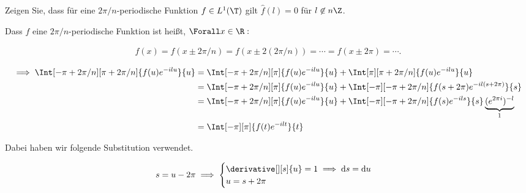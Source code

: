 
\begin{exercise}

Zeigen Sie, dass für eine $2 \pi / n$-periodische Funktion $f \in L^1(\T)$ gilt $\hat f(l) = 0$ für $l \not \in n \Z$.

\end{exercise}


\begin{solution}

Dass $f$ eine $2 \pi / n$-periodische Funktion ist heißt, $\Forall x \in \R:$

\begin{align*}
    f(x)
    =
    f(x \pm 2 \pi / n)
    =
    f(x \pm 2 (2 \pi / n))
    =
    \cdots
    =
    f(x \pm 2 \pi)
    =
    \cdots.
\end{align*}

\begin{align*}
    \implies
    \Int[-\pi + 2 \pi / n][\pi + 2 \pi / n]
    {
        f(u) e^{-i l u}
    }{u}
    & =
    \Int[-\pi + 2 \pi / n][\pi]
    {
        f(u) e^{-i l u}
    }{u}
    +
    \Int[\pi][\pi + 2 \pi / n]
    {
        f(u) e^{-i l u}
    }{u} \\
    & =
    \Int[-\pi + 2 \pi / n][\pi]
    {
        f(u) e^{-i l u}
    }{u}
    +
    \Int[-\pi][-\pi + 2 \pi / n]
    {
        f(s + 2 \pi) e^{-i l (s + 2 \pi)}
    }{s} \\
    & =
    \Int[-\pi + 2 \pi / n][\pi]
    {
        f(u) e^{-i l u}
    }{u}
    +
    \Int[-\pi][-\pi + 2 \pi / n]
    {
        f(s) e^{-i l s}
    }{s}
    \underbrace{(e^{2 \pi i})^{-l}}_1 \\
    & =
    \Int[-\pi][\pi]
    {
        f(t) e^{-i l t}
    }{t}
\end{align*}

Dabei haben wir folgende Substitution verwendet.

\begin{align*}
    s = u - 2 \pi
    \implies
    \begin{cases}
        \derivative[][s]{u} = 1 \implies \mathrm{d} s = \mathrm{d} u \\
        u = s + 2 \pi
    \end{cases}
\end{align*}


\end{solution}
